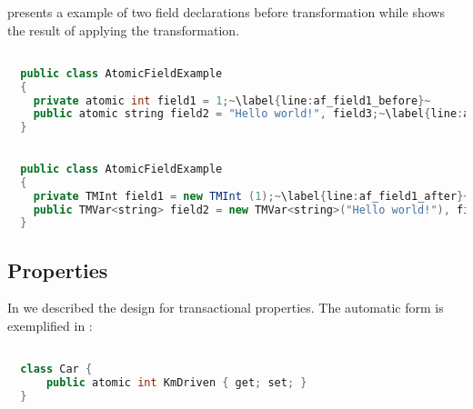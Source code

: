  presents a example of two  field declarations before transformation while  shows the result of applying the transformation.
\begin{lstlisting}[label=lst:before_atomic_field,
  caption={\bscode{atomic} Field Before Transformation},
  language=Java,  
  showspaces=false,
  showtabs=false,
  breaklines=true,
  showstringspaces=false,
  breakatwhitespace=true,
  escapechar=~,
  commentstyle=\color{greencomments},
  keywordstyle=\color{bluekeywords},
  stringstyle=\color{redstrings},
  morekeywords={atomic, retry, orelse, var, get, set}]  % Start your code-block

  public class AtomicFieldExample
  {
    private atomic int field1 = 1;~\label{line:af_field1_before}~
    public atomic string field2 = "Hello world!", field3;~\label{line:af_field2_before}~
  }
\end{lstlisting}

\begin{lstlisting}[label=lst:after_atomic_field,
  caption={\bscode{atomic} Field After Transformation},
  language=Java,  
  showspaces=false,
  showtabs=false,
  breaklines=true,
  showstringspaces=false,
  breakatwhitespace=true,
  escapechar=~,
  commentstyle=\color{greencomments},
  keywordstyle=\color{bluekeywords},
  stringstyle=\color{redstrings},
  morekeywords={atomic, retry, orelse, var, get, set}]  % Start your code-block

  public class AtomicFieldExample
  {
    private TMInt field1 = new TMInt (1);~\label{line:af_field1_after}~
    public TMVar<string> field2 = new TMVar<string>("Hello world!"), field3 = new TMVar<string>();~\label{line:af_field2_after}~
  }
\end{lstlisting}
 

\subsection{Properties}
In  we described the design for transactional properties. The automatic form is exemplified in :

\begin{lstlisting}[label=lst:before_atomic_property,
  caption={Before Transformation},
  language=Java,  
  showspaces=false,
  showtabs=false,
  breaklines=true,
  showstringspaces=false,
  breakatwhitespace=true,
  commentstyle=\color{greencomments},
  keywordstyle=\color{bluekeywords},
  stringstyle=\color{redstrings},
  morekeywords={atomic, retry, orElse, var, get, set}]  % Start your code-block

  class Car {
      public atomic int KmDriven { get; set; }
  }
\end{lstlisting}


